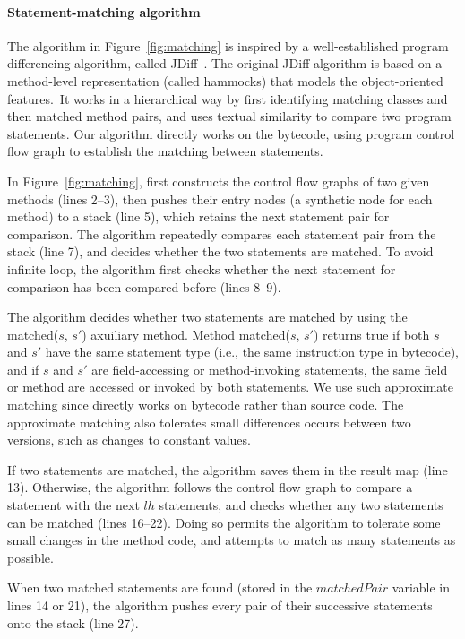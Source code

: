 \paragraph{Statement-matching algorithm}

The algorithm in Figure~\ref{fig:matching} is inspired by
a well-established program differencing algorithm, called
JDiff~\cite{Apiwattanapong:2004}. The original JDiff
algorithm is based on a method-level representation
(called hammocks) that models the object-oriented features.\
It works in a hierarchical way by first identifying matching
classes and then matched method pairs, and uses
textual similarity to compare two program statements. Our
algorithm directly works on the bytecode, using program control flow graph
to establish the matching between statements.

In Figure~\ref{fig:matching}, \ourtool first constructs the control
flow graphs of two given methods (lines 2--3), then pushes their
entry nodes (a synthetic node for each method) to a stack (line 5), which retains
the next statement pair for comparison. The algorithm repeatedly
compares each statement pair from the stack (line 7), and
decides whether the two statements are matched.  To avoid infinite
loop, the algorithm first checks whether the next statement for comparison
has been compared before (lines 8--9). 

The algorithm decides whether two statements are matched by using
the matched($\mathit{s}$, $\mathit{s'}$) axuiliary method. Method
matched($\mathit{s}$, $\mathit{s'}$) returns true if both
$\mathit{s}$ and $\mathit{s'}$ have the same statement type (i.e.,
the same instruction type in bytecode), and if $\mathit{s}$ and
$\mathit{s'}$ are field-accessing or method-invoking statements,
the same field or method are accessed or invoked by both statements.
We use such approximate matching since \ourtool directly works
on bytecode rather than source code. The approximate matching also
tolerates small differences
occurs between two versions, such as changes to constant values.


If two statements are matched, the algorithm saves them in the
result map (line 13). Otherwise,
the algorithm follows the control flow graph to compare a statement with
the next $lh$ statements, and checks whether any two statements can be
matched (lines 16--22). Doing so permits the algorithm to tolerate some small
changes in the method code, and attempts to match as many statements as possible.

When two matched statements are found  (stored in
the $\mathit{matchedPair}$ variable in lines 14 or 21),
the algorithm pushes every pair of
their successive statements onto the stack (line 27).



